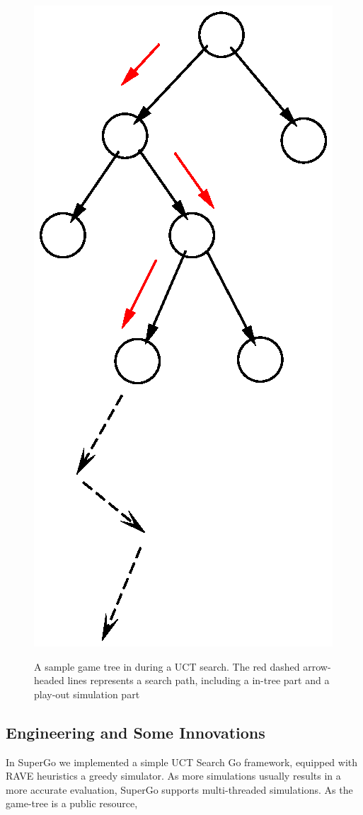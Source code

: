 \begin{figure}
  \centering
  \includegraphics[width=.2\textwidth]{tree.eps}\\
  \caption{A sample game tree in during a UCT search. The red dashed arrow-headed lines represents a search path, including a in-tree part and a play-out simulation part}\label{fig:tree}
\end{figure}

\subsection{Engineering and Some Innovations}
In SuperGo we implemented a simple UCT Search Go framework, equipped with RAVE heuristics a greedy simulator. As more simulations usually results in a more accurate evaluation, SuperGo supports multi-threaded simulations. As the game-tree is a public resource, 







